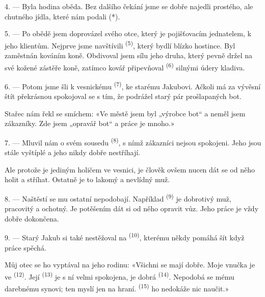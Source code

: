 4. --- Byla hodina oběda. Bez dalšího čekání jsme se dobře najedli prostého, ale chutného
jídla, které nám podali (*).

\VUsaut{3.0mm}

5. --- Po obědě jsem doprovázel svého otce, který je pojišťovacím jednatelem, k jeho klientům.
Nejprve jsme navštívili  \textsuperscript{(5)}, který bydlí blízko hostince.
Byl zaměstnán kováním koně. Obdivoval jsem sílu jeho druha, který pevně držel na své kožené
zástěře  koně, zatímco kovář připevňoval
 \textsuperscript{(6)} silnými údery kladiva.

6. --- Potom jsme šli k vesnickému  \textsuperscript{(7)}, ke starému Jakubovi.
Ačkoli má za vývěsní štít překrásnou  spokojoval se s tím, že podrážel starý pár
prošlapaných bot.

Stařec nám řekl se smíchem: «Ve městě jsem byl „výrobce bot“ a neměl jsem zákazníky. Zde jsem
„opravář bot“ a práce je mnoho.»

7. --- Mluvil nám o svém sousedu  \textsuperscript{(8)}, s nímž zákazníci
nejsou spokojeni. Jeho  jsou stále vyštíplé a jeho
 nikdy dobře nestříhají.

Ale protože je jediným holičem ve vesnici, je člověk ovšem nucen dát se od něho holit a
stříhat. Ostatně je to lakomý a nevlídný muž.

8. --- Naštěstí se mu ostatní  nepodobají. Například 
\textsuperscript{(9)} je dobrotivý muž, pracovitý a ochotný. Je potěšením dát si od něho
opravit vůz. Jeho práce je vždy dobře dokončena.

9. --- Starý Jakub si také nestěžoval na  \textsuperscript{(10)}, kterému
někdy pomáhá šít  když práce spěchá.

Můj otec se ho vyptával na jeho rodinu: «Všichni se mají dobře. Moje vnučka je ve
 \textsuperscript{(12)}. Její  \textsuperscript{(13)} je
s ní velmi spokojena, je dobrá  \textsuperscript{(14)}. Nepodobá se mému
darebnému synovi; ten myslí jen na hraní.  \textsuperscript{(15)} ho nedokáže
nic naučit.»

\VUsaut{3.0mm}
\VUsaut{3.0mm}

